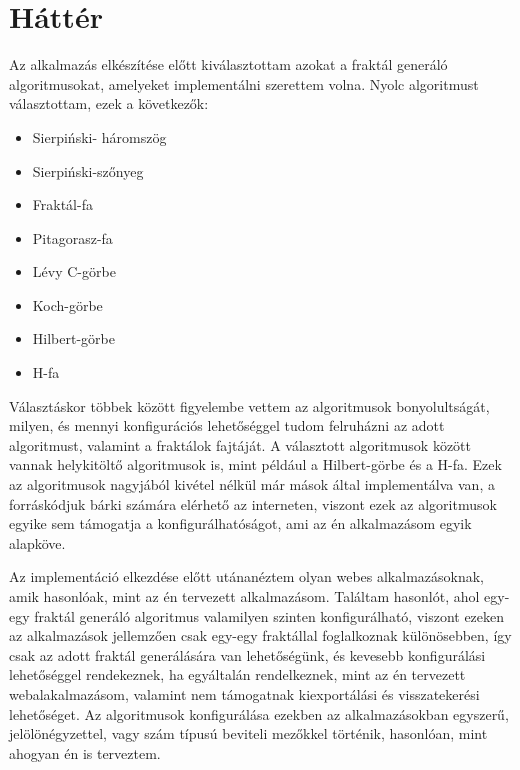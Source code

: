 \chapter*{Háttér}
Az alkalmazás elkészítése előtt kiválasztottam azokat a fraktál generáló algoritmusokat, amelyeket implementálni szerettem volna. Nyolc algoritmust választottam, ezek a következők: 
\begin{itemize}
	\item Sierpiński- háromszög
	\item Sierpiński-szőnyeg
	\item Fraktál-fa
	\item Pitagorasz-fa
	\item Lévy C-görbe
	\item Koch-görbe
	\item Hilbert-görbe
	\item H-fa
\end{itemize}
Választáskor többek között figyelembe vettem az algoritmusok bonyolultságát, milyen, és mennyi konfigurációs lehetőséggel tudom felruházni az adott algoritmust, valamint a fraktálok fajtáját. A választott algoritmusok között vannak helykitöltő algoritmusok is, mint például a Hilbert-görbe és a H-fa. Ezek az algoritmusok nagyjából kivétel nélkül már mások által implementálva van, a forráskódjuk bárki számára elérhető az interneten, viszont ezek az algoritmusok egyike sem támogatja a konfigurálhatóságot, ami az én alkalmazásom egyik alapköve. 
\par Az implementáció elkezdése előtt utánanéztem olyan webes alkalmazásoknak, amik hasonlóak, mint az én tervezett alkalmazásom. Találtam hasonlót, ahol egy-egy fraktál generáló algoritmus valamilyen szinten konfigurálható, viszont ezeken az alkalmazások jellemzően csak egy-egy fraktállal foglalkoznak különösebben, így csak az adott fraktál generálására van lehetőségünk, és kevesebb konfigurálási lehetőséggel rendekeznek, ha egyáltalán rendelkeznek, mint az én tervezett webalakalmazásom, valamint nem támogatnak kiexportálási és visszatekerési lehetőséget. Az algoritmusok konfigurálása ezekben az alkalmazásokban egyszerű, jelölönégyzettel, vagy szám típusú beviteli mezőkkel történik, hasonlóan, mint ahogyan én is terveztem. 
